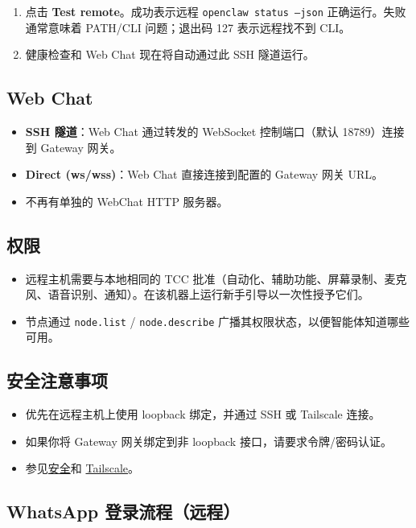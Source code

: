 \begin{enumerate}
  \item 点击 \textbf{Test remote}。成功表示远程 \texttt{openclaw status --json} 正确运行。失败通常意味着 PATH/CLI 问题；退出码 127 表示远程找不到 CLI。
  \item 健康检查和 Web Chat 现在将自动通过此 SSH 隧道运行。
\end{enumerate}


\subsection{Web Chat}


\begin{itemize}
  \item \textbf{SSH 隧道}：Web Chat 通过转发的 WebSocket 控制端口（默认 18789）连接到 Gateway 网关。
  \item \textbf{Direct (ws/wss)}：Web Chat 直接连接到配置的 Gateway 网关 URL。
  \item 不再有单独的 WebChat HTTP 服务器。
\end{itemize}


\subsection{权限}


\begin{itemize}
  \item 远程主机需要与本地相同的 TCC 批准（自动化、辅助功能、屏幕录制、麦克风、语音识别、通知）。在该机器上运行新手引导以一次性授予它们。
  \item 节点通过 \texttt{node.list} / \texttt{node.describe} 广播其权限状态，以便智能体知道哪些可用。
\end{itemize}


\subsection{安全注意事项}


\begin{itemize}
  \item 优先在远程主机上使用 loopback 绑定，并通过 SSH 或 Tailscale 连接。
  \item 如果你将 Gateway 网关绑定到非 loopback 接口，请要求令牌/密码认证。
  \item 参见\href{/gateway/security}{安全}和 \href{/gateway/tailscale}{Tailscale}。
\end{itemize}


\subsection{WhatsApp 登录流程（远程）}


